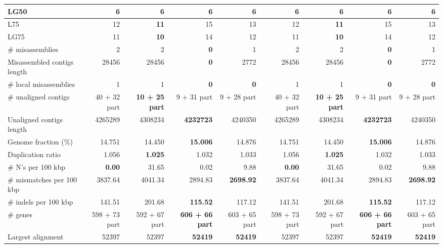 \documentclass[12pt,a4paper]{article}
\begin{document}
\begin{table}[ht]
\begin{center}
\begin{tabular}{|l*{8}{|r}|}
LG50 & 6 & 6 & 6 & 6 & 6 & 6 & 6 & 6 \\ \hline
L75 & 12 & {\bf 11} & 15 & 13 & 12 & {\bf 11} & 15 & 13 \\ \hline
LG75 & 11 & {\bf 10} & 14 & 12 & 11 & {\bf 10} & 14 & 12 \\ \hline
\# misassemblies & 2 & 2 & {\bf 0} & 1 & 2 & 2 & {\bf 0} & 1 \\ \hline
Misassembled contigs length & 28456 & 28456 & {\bf 0} & 2772 & 28456 & 28456 & {\bf 0} & 2772 \\ \hline
\# local misassemblies & 1 & 1 & {\bf 0} & {\bf 0} & 1 & 1 & {\bf 0} & {\bf 0} \\ \hline
\# unaligned contigs & 40 + 32 part & {\bf 10 + 25 part} & 9 + 31 part & 9 + 28 part & 40 + 32 part & {\bf 10 + 25 part} & 9 + 31 part & 9 + 28 part \\ \hline
Unaligned contigs length & 4265289 & 4308234 & {\bf 4232723} & 4240350 & 4265289 & 4308234 & {\bf 4232723} & 4240350 \\ \hline
Genome fraction (\%) & 14.751 & 14.450 & {\bf 15.006} & 14.876 & 14.751 & 14.450 & {\bf 15.006} & 14.876 \\ \hline
Duplication ratio & 1.056 & {\bf 1.025} & 1.032 & 1.033 & 1.056 & {\bf 1.025} & 1.032 & 1.033 \\ \hline
\# N's per 100 kbp & {\bf 0.00} & 31.65 & 0.02 & 9.88 & {\bf 0.00} & 31.65 & 0.02 & 9.88 \\ \hline
\# mismatches per 100 kbp & 3837.64 & 4041.34 & 2894.83 & {\bf 2698.92} & 3837.64 & 4041.34 & 2894.83 & {\bf 2698.92} \\ \hline
\# indels per 100 kbp & 141.51 & 201.68 & {\bf 115.52} & 117.12 & 141.51 & 201.68 & {\bf 115.52} & 117.12 \\ \hline
\# genes & 598 + 73 part & 592 + 67 part & {\bf 606 + 66 part} & 603 + 65 part & 598 + 73 part & 592 + 67 part & {\bf 606 + 66 part} & 603 + 65 part \\ \hline
Largest alignment & 52397 & 52397 & {\bf 52419} & {\bf 52419} & 52397 & 52397 & {\bf 52419} & {\bf 52419} \\ \hline
\end{tabular}
\end{center}
\end{table}
\end{document}
